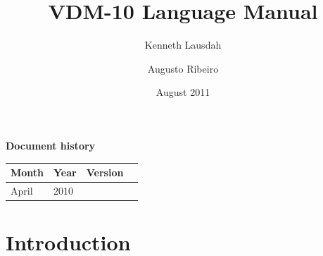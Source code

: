 \documentclass{overturerepchap}
\begin{document}
 
\title{VDM-10 Language Manual}
\author{ Kenneth Lausdah \and Augusto Ribeiro}

\date{August 2011}

\maketitle


{\textbf{Document history}}

\begin{tabular}{|l|l|l|l|}\hline
Month   & Year & Version \\ \hline
April   & 2010 &    \\ \hline
\end{tabular}

\tableofcontents
\newpage
\mbox{}
\newpage
{} 
\setcounter{page}{1}

\chapter{Introduction}


\end{document}

